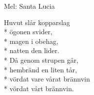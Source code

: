 \begin{SongText}
    \begin{SongInfo}
        Mel: Santa Lucia
    \end{SongInfo}
    \begin{SongVerse}
        Huvut slår kopparslag\\*%
        ögonen svider,\\*%
        magen i obehag,\\*%
        natten den lider.\\*%
        Då genom strupen går,\\*%
        hembränd en liten tår,\\*%
        vördat vare vårat brännvin\\*%
        vördat vårt brännvin.
    \end{SongVerse}
\end{SongText}
